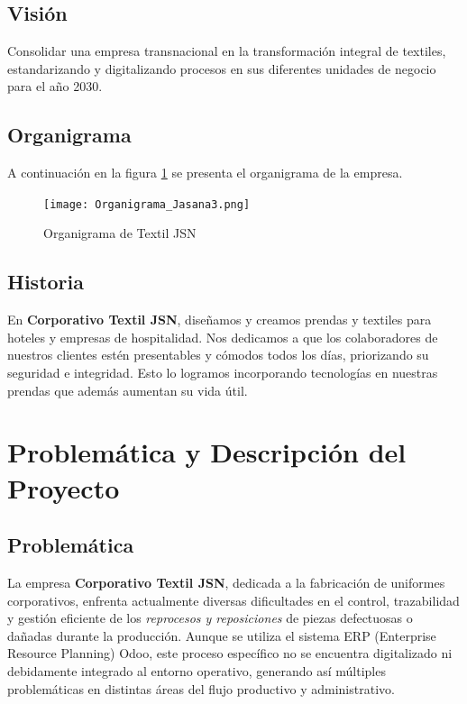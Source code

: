 \documentclass[12pt,letterpaper,spanish]{report}
\begin{document}
\section{Visión}
Consolidar una empresa transnacional en la transformación integral de textiles, estandarizando y digitalizando procesos en sus diferentes unidades de negocio para el año 2030.

\section{Organigrama}
A continuación en la figura \ref{a2} se presenta el organigrama de la empresa.

\begin{figure}[htp]
  \centering
  \texttt{[image: Organigrama\_Jasana3.png]}
  \caption{Organigrama de Textil JSN}\label{a2}
\end{figure}

\section{Historia}
En \textbf{Corporativo Textil JSN}, diseñamos y creamos prendas y textiles para hoteles y empresas de hospitalidad.
Nos dedicamos a que los colaboradores de nuestros clientes estén presentables y cómodos todos los días, priorizando su seguridad e integridad.
Esto lo logramos incorporando tecnologías en nuestras prendas que además aumentan su vida útil.


\newpage




\chapter{Problemática y Descripción del Proyecto}
\newpage

\section{Problemática}

La empresa \textbf{Corporativo Textil JSN}, dedicada a la fabricación de uniformes corporativos, enfrenta actualmente diversas dificultades en el control, trazabilidad y gestión eficiente de los \textit{reprocesos y reposiciones} de piezas defectuosas o dañadas durante la producción. Aunque se utiliza el sistema ERP (Enterprise Resource Planning) Odoo, este proceso específico no se encuentra digitalizado ni debidamente integrado al entorno operativo, generando así múltiples problemáticas en distintas áreas del flujo productivo y administrativo.
\end{document}
